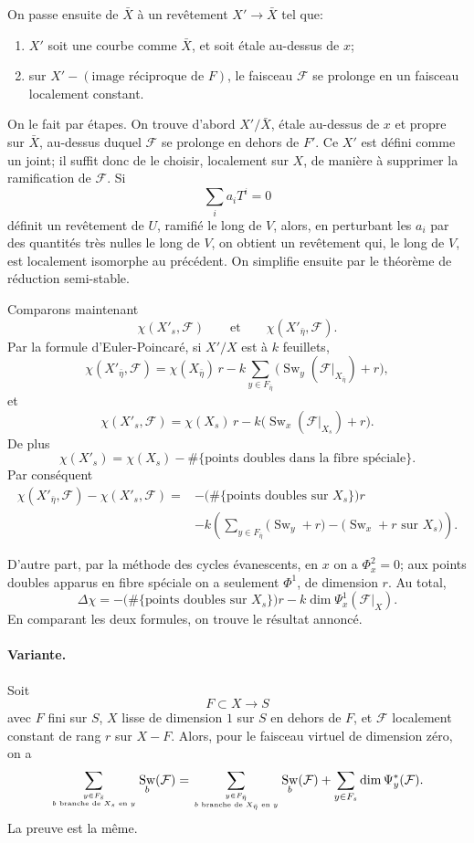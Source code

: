 \documentclass[11pt]{article}
\newcommand{\F}{\mathcal F}
\DeclareMathOperator{\Sw}{Sw}
\begin{document}
On passe ensuite de \(\bar X\) à un revêtement \(X'\to\bar X\) tel que:
\begin{enumerate}[label=\alph*)]
\item \(X'\) soit une courbe comme \(\bar X\), et soit étale au-dessus de \(x\);
\item sur \(X'-(\text{image réciproque de }F)\), le faisceau \(\F\) se prolonge en un faisceau localement constant.
\end{enumerate}

On le fait par étapes. On trouve d'abord \(X'/\bar X\), étale au-dessus de \(x\) et propre sur \(\bar X\), au-dessus duquel \(\F\) se prolonge en dehors de \(F'\). Ce \(X'\) est défini comme un joint; il suffit donc de le choisir, localement sur \(X\), de manière à supprimer la ramification de \(\F\). Si
\[
  \sum_i a_i T^i=0
\]
définit un revêtement de \(U\), ramifié le long de \(V\), alors, en perturbant les \(a_i\) par des quantités très nulles le long de \(V\), on obtient un revêtement qui, le long de \(V\), est localement isomorphe au précédent. On simplifie ensuite par le théorème de réduction semi-stable.

Comparons maintenant
\[
  \chi(X'_s,\F)\qquad\text{et}\qquad \chi(X'_{\bar\eta},\F).
\]
Par la formule d'Euler-Poincaré, si \(X'/X\) est à \(k\) feuillets,
\[
 \chi(X'_{\bar\eta},\F)
 =\chi(X_{\bar\eta})\,r
 -k\sum_{y\in F_{\bar\eta}}
   \bigl(\Sw_y(\F|_{X_{\bar\eta}})+r\bigr),
\]
et
\[
 \chi(X'_s,\F)
 =\chi(X_s)\,r
 -k\bigl(\Sw_x(\F|_{X_s})+r\bigr).
\]
De plus
\[
  \chi(X'_s)=\chi(X_s)-
  \#\{\text{points doubles dans la fibre spéciale}\}.
\]
Par conséquent
\[
\begin{aligned}
\chi(X'_{\bar\eta},\F)-\chi(X'_s,\F)
={}&-\bigl(\#\{\text{points doubles sur }X_s\}\bigr)r \\
&-k\left(
 \sum_{y\in F_{\bar\eta}}\bigl(\Sw_y+r\bigr)
 -\bigl(\Sw_x+r\text{ sur }X_s\bigr)
\right).
\end{aligned}
\]

D'autre part, par la méthode des cycles évanescents, en \(x\) on a \(\Phi_x^2=0\); aux points doubles apparus en fibre spéciale on a seulement \(\Phi^1\), de dimension \(r\). Au total,
\[
  \Delta\chi
  =-\bigl(\#\{\text{points doubles sur }X_s\}\bigr)r
   -k\dim \Psi_x^1(\F|_X).
\]
En comparant les deux formules, on trouve le résultat annoncé.

\paragraph{Variante.}
Soit
\[
  F\subset X\longrightarrow S
\]
avec \(F\) fini sur \(S\), \(X\) lisse de dimension \(1\) sur \(S\) en dehors de \(F\), et \(\F\) localement constant de rang \(r\) sur \(X-F\). Alors, pour le faisceau virtuel de dimension zéro, on a
\[
\sum_{y\in F_{\bar s}\atop b\text{ branche de }X_s\text{ en }y}
\Sw_b(\F)
=
\sum_{y\in F_{\bar\eta}\atop b\text{ branche de }X_{\bar\eta}\text{ en }y}
\Sw_b(\F)
+
\sum_{y\in F_s}\dim \Psi_y^*(\F).
\]
La preuve est la même.
\end{document}
